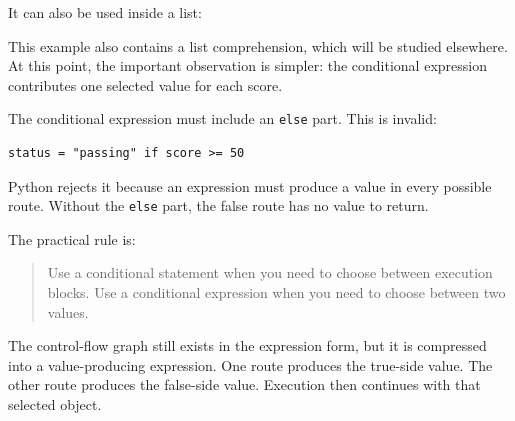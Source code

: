 It can also be used inside a list:

This example also contains a list comprehension, which will be studied elsewhere. At this point, the important observation is simpler: the conditional expression contributes one selected value for each score.

The conditional expression must include an \texttt{else} part. This is invalid:

\begin{verbatim}
status = "passing" if score >= 50
\end{verbatim}

Python rejects it because an expression must produce a value in every possible route. Without the \texttt{else} part, the false route has no value to return.

The practical rule is:

\begin{quote}
Use a conditional statement when you need to choose between execution blocks. Use a conditional expression when you need to choose between two values.
\end{quote}

The control-flow graph still exists in the expression form, but it is compressed into a value-producing expression. One route produces the true-side value. The other route produces the false-side value. Execution then continues with that selected object.
